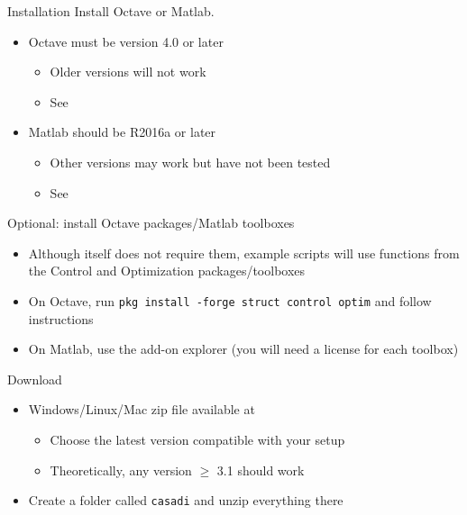 \documentclass[xcolor=dvipsnames]{beamer}
\begin{document}
%
\begin{frame}[allowframebreaks]{Installation}
    Install Octave or Matlab.
    \begin{itemize}
        \item Octave must be version 4.0 or later
        \begin{itemize}
            \item Older versions will not work
            \item See 
        \end{itemize}
        \item Matlab should be R2016a or later
        \begin{itemize}
            \item Other versions may work but have not been tested
            \item See 
        \end{itemize}
    \end{itemize}
    
    \medskip
    
    Optional: install Octave packages/Matlab toolboxes
    \begin{itemize}
        \item Although \mpctools{} itself does not require them, example scripts will use functions from the Control and Optimization packages/toolboxes
        \item On Octave, run \lstinline!pkg install -forge struct control optim! and follow instructions
        \item On Matlab, use the add-on explorer (you will need a license for each toolbox)
    \end{itemize}
    
    \framebreak
    
    Download \casadi{}
    \begin{itemize}
        \item Windows/Linux/Mac zip file available at 
            \begin{itemize}
                \item Choose the latest version compatible with your setup
                \item Theoretically, any version $\geq$ 3.1 should work
            \end{itemize}
        \item Create a folder called \texttt{casadi} and unzip everything there
    \end{itemize}
    

\end{frame}
\end{document}
